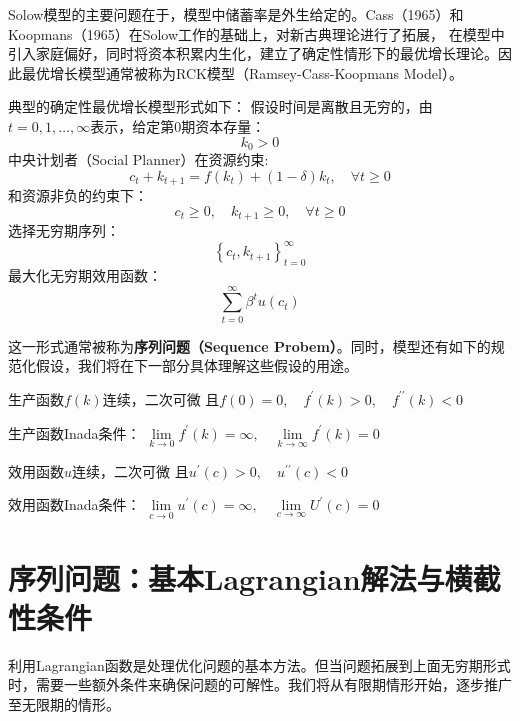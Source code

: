 Solow模型的主要问题在于，模型中储蓄率是外生给定的。Cass（1965）和Koopmans（1965）在Solow工作的基础上，对新古典理论进行了拓展，
在模型中引入家庭偏好，同时将资本积累内生化，建立了确定性情形下的最优增长理论。因此最优增长模型通常被称为RCK模型（Ramsey-Cass-Koopmans Model）。

典型的确定性最优增长模型形式如下：
假设时间是离散且无穷的，由$t=0,1,\dots, \infty$表示，给定第0期资本存量：
$$k_0>0$$
中央计划者（Social Planner）在资源约束:
$$c_t+k_{t+1}=f\left(k_t\right)+(1-\delta)k_t,\quad \forall t \geq 0$$
和资源非负的约束下：
$$c_t \geq 0, \quad k_{t+1} \geq 0, \quad \forall t \geq 0$$
选择无穷期序列：
$$\left\{c_t, k_{t+1}\right\}_{t=0}^{\infty}$$
最大化无穷期效用函数：
$$\sum_{t=0}^{\infty} \beta^t u\left(c_t\right)$$

这一形式通常被称为\textbf{序列问题（Sequence Probem）}。同时，模型还有如下的规范化假设，我们将在下一部分具体理解这些假设的用途。
\begin{assumption} \label{as-f}
    生产函数$f\left(k\right)$连续，二次可微
        且$f\left(0\right)=0,\quad f^{\prime}\left(k\right)>0,\quad f^{\prime\prime}\left(k\right)<0$
\end{assumption}
\begin{assumption} \label{as-f-inada}
    生产函数Inada条件：
        $\lim\limits_{k \rightarrow 0} f^{\prime}(k)=\infty, \quad \lim\limits_{k \rightarrow \infty} f^{\prime}(k)=0$
\end{assumption}
\begin{assumption} \label{as-u}
    效用函数$u$连续，二次可微
        且$u^{\prime}\left(c\right)>0,\quad u^{\prime\prime}\left(c\right)<0$
\end{assumption}
\begin{assumption} \label{as-u-inada}
    效用函数Inada条件：
    $\lim\limits_{c \rightarrow 0} u^{\prime}(c)=\infty, \quad \lim\limits_{c \rightarrow \infty} U^{\prime}(c)=0$
\end{assumption}


\section{序列问题：基本Lagrangian解法与横截性条件} \label{sec-sp}

利用Lagrangian函数是处理优化问题的基本方法。但当问题拓展到上面无穷期形式时，需要一些额外条件来确保问题的可解性。我们将从有限期情形开始，逐步推广至无限期的情形。

